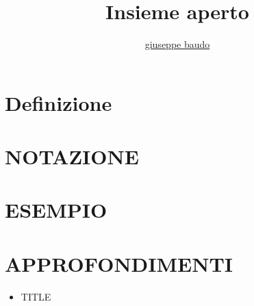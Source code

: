 \documentclass[a4paper,10pt]{article}
\title{Insieme aperto}
\author{\href{http://www.baudo.hol.es}{giuseppe baudo}}
\begin{document}
\maketitle

\section{Definizione}

\section{NOTAZIONE}

\section{ESEMPIO}

\section{APPROFONDIMENTI}
\begin{itemize}
 \item TITLE
\end{itemize}
\end{document}
